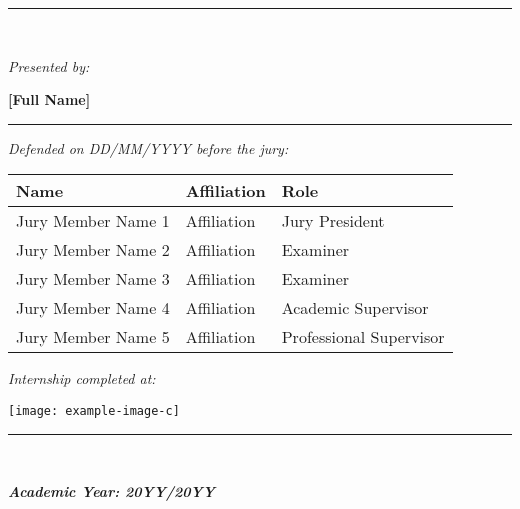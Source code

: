 \begin{titlepage}
    \vspace{0.2cm}

    \rule{0.5\textwidth}{1pt}\\[0.1cm]
    {\large\itshape Presented by:\par}
    \vspace{0.1cm}
    {\Large\bfseries [Full Name]\par}
    \rule{0.5\textwidth}{1pt}
    
    \vspace{0.7cm}
    
    {\large\itshape Defended on DD/MM/YYYY before the jury:\par}
    \vspace{0.2cm}
    \noindent
    \begin{tabularx}{\textwidth}{>{\raggedright\arraybackslash}X>{\raggedright\arraybackslash}X>{\raggedleft\arraybackslash}l}
        \toprule
        \textbf{Name} & \textbf{Affiliation} & \textbf{Role} \\
        \midrule
        Jury Member Name 1 & Affiliation & Jury President \\
        Jury Member Name 2 & Affiliation & Examiner \\
        Jury Member Name 3 & Affiliation & Examiner \\
        Jury Member Name 4 & Affiliation & Academic Supervisor \\
        Jury Member Name 5 & Affiliation & Professional Supervisor \\
        \bottomrule
    \end{tabularx}

    \vspace{1cm}

    {\large\itshape Internship completed at:\par}
    \vspace{0.2cm}
    \texttt{[image: example-image-c]} %

    \vfill

    \begin{center}
        \rule{0.5\textwidth}{1pt}\\[0.1cm]
        {\large\bfseries\itshape Academic Year: 20YY/20YY\par}
    \end{center}
    
    \restoregeometry
\end{titlepage}